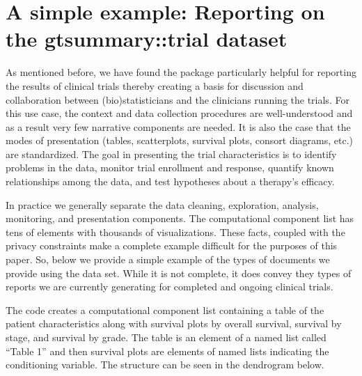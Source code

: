 \documentclass[
]{jss}
\begin{document}
\hypertarget{a-simple-example-reporting-on-the-gtsummarytrial-dataset}{%
\section{A simple example: Reporting on the gtsummary::trial
dataset}\label{a-simple-example-reporting-on-the-gtsummarytrial-dataset}}

\label{sect:simple-example}

As mentioned before, we have found the  package
particularly helpful for reporting the results of clinical trials
thereby creating a basis for discussion and collaboration between
(bio)statisticians and the clinicians running the trials. For this use
case, the context and data collection procedures are well-understood and
as a result very few narrative components are needed. It is also the
case that the modes of presentation (tables, scatterplots, survival
plots, consort diagrams, etc.) are standardized. The goal in presenting
the trial characteristics is to identify problems in the data, monitor
trial enrollment and response, quantify known relationships among the
data, and test hypotheses about a therapy's efficacy.

In practice we generally separate the data cleaning, exploration,
analysis, monitoring, and presentation components. The computational
component list has tens of elements with thousands of visualizations.
These facts, coupled with the privacy constraints make a complete
example difficult for the purposes of this paper. So, below we provide a
simple example of the types of documents we provide using the
 data set. While it is not complete, it does
convey they types of reports we are currently generating for completed
and ongoing clinical trials.

The code creates a computational component list containing a table of
the patient characteristics along with survival plots by overall
survival, survival by stage, and survival by grade. The table is an
element of a named list called ``Table 1'' and then survival plots are
elements of named lists indicating the conditioning variable. The
structure can be seen in the dendrogram below.
\end{document}
